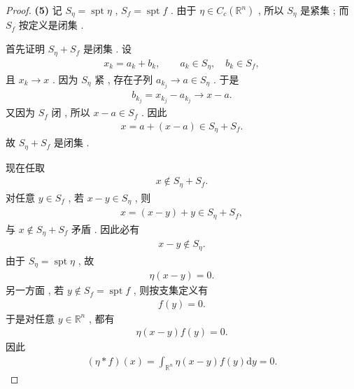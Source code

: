 \documentclass[../main.tex]{subfiles}
\begin{document}
\begin{proof}
\textbf{(5)}
记 $S_\eta=\operatorname{spt}\eta$ , $S_f=\operatorname{spt}f$ .
由于 $\eta\in C_c(\mathbb R^n)$ , 所以 $S_\eta$ 是紧集 ; 而 $S_f$ 按定义是闭集 .

首先证明 $S_\eta+S_f$ 是闭集 . 设
\begin{align*}
x_k=a_k+b_k,\qquad a_k\in S_\eta,\quad b_k\in S_f,
\end{align*}
且 $x_k\to x$ . 因为 $S_\eta$ 紧 , 存在子列 $a_{k_j}\to a\in S_\eta$ . 于是
\begin{align*}
b_{k_j}=x_{k_j}-a_{k_j}\to x-a.
\end{align*}
又因为 $S_f$ 闭 , 所以 $x-a\in S_f$ . 因此
\begin{align*}
x=a+(x-a)\in S_\eta+S_f.
\end{align*}
故 $S_\eta+S_f$ 是闭集 .

现在任取
\begin{align*}
x\notin S_\eta+S_f.
\end{align*}
对任意 $y\in S_f$ , 若 $x-y\in S_\eta$ , 则
\begin{align*}
x=(x-y)+y\in S_\eta+S_f,
\end{align*}
与 $x\notin S_\eta+S_f$ 矛盾 . 因此必有
\begin{align*}
x-y\notin S_\eta.
\end{align*}
由于 $S_\eta=\operatorname{spt}\eta$ , 故
\begin{align*}
\eta(x-y)=0.
\end{align*}
另一方面 , 若 $y\notin S_f=\operatorname{spt}f$ , 则按支集定义有
\begin{align*}
f(y)=0.
\end{align*}
于是对任意 $y\in\mathbb R^n$ , 都有
\begin{align*}
\eta(x-y)f(y)=0.
\end{align*}
因此
\begin{align*}
(\eta*f)(x)=\int_{\mathbb R^n}\eta(x-y)f(y)\mathrm{d}y=0.
\end{align*}


\end{proof}
\end{document}
